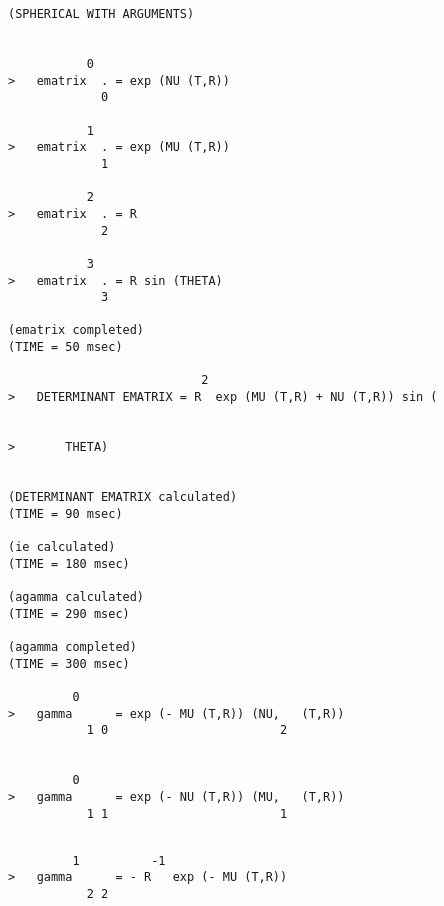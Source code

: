 \begin{verbatim}
(SPHERICAL WITH ARGUMENTS)


           0
>   ematrix  . = exp (NU (T,R))
             0

           1
>   ematrix  . = exp (MU (T,R))
             1

           2
>   ematrix  . = R
             2

           3
>   ematrix  . = R sin (THETA)
             3

(ematrix completed)
(TIME = 50 msec)

                           2
>   DETERMINANT EMATRIX = R  exp (MU (T,R) + NU (T,R)) sin (


>       THETA)


(DETERMINANT EMATRIX calculated)
(TIME = 90 msec)

(ie calculated)
(TIME = 180 msec)

(agamma calculated)
(TIME = 290 msec)

(agamma completed)
(TIME = 300 msec)

         0
>   gamma      = exp (- MU (T,R)) (NU,   (T,R))
           1 0                        2


         0
>   gamma      = exp (- NU (T,R)) (MU,   (T,R))
           1 1                        1


\end{verbatim}
{\samepage
\begin{verbatim}
         1          -1
>   gamma      = - R   exp (- MU (T,R))
           2 2
\end{verbatim}
    }
